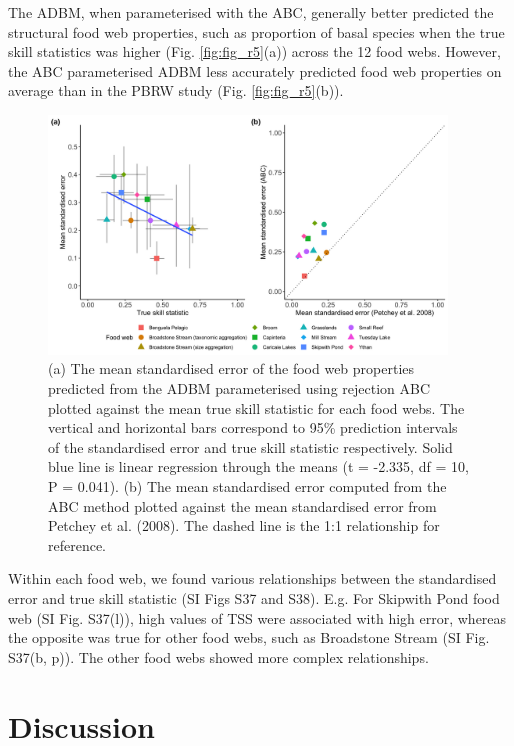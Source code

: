 \documentclass{article}
\begin{document}
The ADBM, when parameterised with the ABC, generally better predicted
the structural food web properties, such as proportion of basal species
when the true skill statistics was higher (Fig. \ref{fig:fig_r5}(a))
across the 12 food webs. However, the ABC parameterised ADBM less
accurately predicted food web properties on average than in the PBRW
study (Fig. \ref{fig:fig_r5}(b)).

\begin{figure}

{\centering \includegraphics[width=400px]{fig/fig7} 

}

\caption{\label{fig:fig_r5} (a) The mean standardised error of the food web properties predicted from the ADBM parameterised using rejection ABC plotted against the mean true skill statistic for each food webs. The vertical and horizontal bars correspond to 95\% prediction intervals of the standardised error and true skill statistic respectively. Solid blue line is linear regression through the means (t = -2.335, df = 10, P = 0.041). (b) The mean standardised error computed from the ABC method plotted against the mean standardised error from Petchey et al. (2008). The dashed line is the 1:1 relationship for reference.}\label{fig:unnamed-chunk-9}
\end{figure}

Within each food web, we found various relationships between the
standardised error and true skill statistic (SI Figs S37 and S38). E.g.
For Skipwith Pond food web (SI Fig. S37(l)), high values of TSS were
associated with high error, whereas the opposite was true for other food
webs, such as Broadstone Stream (SI Fig. S37(b, p)). The other food webs
showed more complex relationships.

\hypertarget{discussion}{%
\section{Discussion}\label{discussion}}
\end{document}
